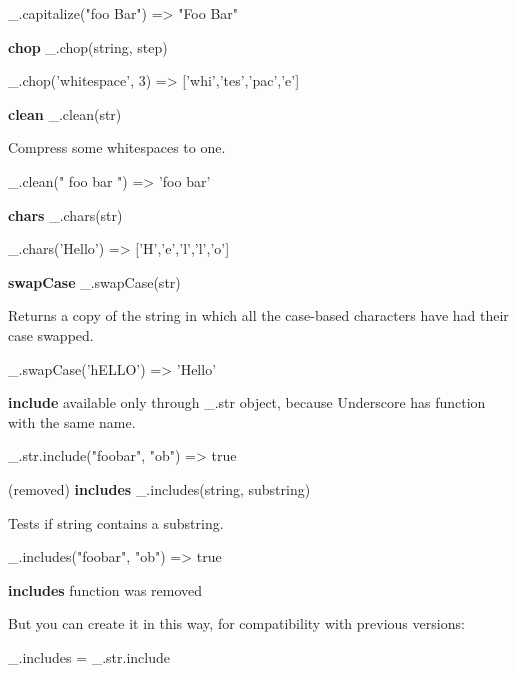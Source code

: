 \begin{DoxyCode}
\_.capitalize("foo Bar")
=> "Foo Bar"
\end{DoxyCode}


{\bfseries chop} \+\_\+.\+chop(string, step)


\begin{DoxyCode}
\_.chop('whitespace', 3)
=> ['whi','tes','pac','e']
\end{DoxyCode}


{\bfseries clean} \+\_\+.\+clean(str)

Compress some whitespaces to one.


\begin{DoxyCode}
\_.clean(" foo    bar   ")
=> 'foo bar'
\end{DoxyCode}


{\bfseries chars} \+\_\+.\+chars(str)


\begin{DoxyCode}
\_.chars('Hello')
=> ['H','e','l','l','o']
\end{DoxyCode}


{\bfseries swap\+Case} \+\_\+.\+swap\+Case(str)

Returns a copy of the string in which all the case-\/based characters have had their case swapped.


\begin{DoxyCode}
\_.swapCase('hELLO')
=> 'Hello'
\end{DoxyCode}


{\bfseries include} available only through \+\_\+.\+str object, because Underscore has function with the same name.


\begin{DoxyCode}
\_.str.include("foobar", "ob")
=> true
\end{DoxyCode}


(removed) {\bfseries includes} \+\_\+.\+includes(string, substring)

Tests if string contains a substring.


\begin{DoxyCode}
\_.includes("foobar", "ob")
=> true
\end{DoxyCode}


{\bfseries includes} function was removed

But you can create it in this way, for compatibility with previous versions\+:


\begin{DoxyCode}
\_.includes = \_.str.include
\end{DoxyCode}


